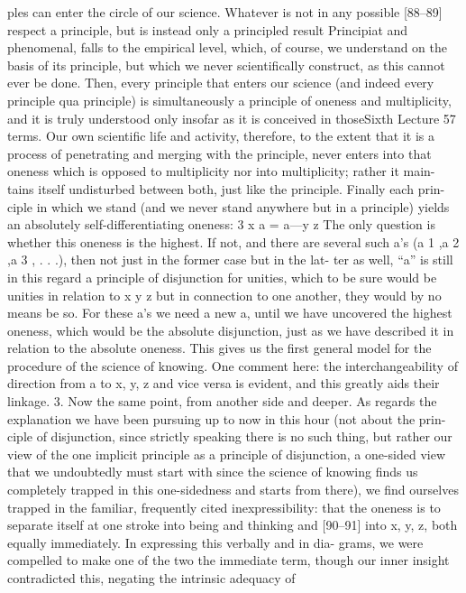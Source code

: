 ples can enter the circle of our science. Whatever is not in any possible
[88–89] respect a principle, but is instead only a principled result {Principiat}
and phenomenal, falls to the empirical level, which, of course, we understand
on the basis of its principle, but which we never scientifically construct, as this
cannot ever be done. Then, every principle that enters our science (and indeed
every principle qua principle) is simultaneously a principle of oneness and
multiplicity, and it is truly understood only insofar as it is conceived in thoseSixth Lecture
57
terms. Our own scientific life and activity, therefore, to the extent that it is a
process of penetrating and merging with the principle, never enters into that
oneness which is opposed to multiplicity nor into multiplicity; rather it main-
tains itself undisturbed between both, just like the principle. Finally each prin-
ciple in which we stand (and we never stand anywhere but in a principle)
yields an absolutely self-differentiating oneness: 3
x
a = a—y
z
The only question is whether this oneness is the highest. If not, and there
are several such a’s (a 1 ,a 2 ,a 3 , . . .), then not just in the former case but in the lat-
ter as well, “a” is still in this regard a principle of disjunction for unities, which
to be sure would be unities in relation to
x
y
z
but in connection to one another, they would by no means be so. For these a’s
we need a new a, until we have uncovered the highest oneness, which would
be the absolute disjunction, just as we have described it in relation to the
absolute oneness. This gives us the first general model for the procedure of the
science of knowing.
One comment here: the interchangeability of direction from a to x, y, z
and vice versa is evident, and this greatly aids their linkage.
3. Now the same point, from another side and deeper. As regards the
explanation we have been pursuing up to now in this hour (not about the prin-
ciple of disjunction, since strictly speaking there is no such thing, but rather our
view of the one implicit principle as a principle of disjunction, a one-sided
view that we undoubtedly must start with since the science of knowing finds
us completely trapped in this one-sidedness and starts from there), we find
ourselves trapped in the familiar, frequently cited inexpressibility: that the
oneness is to separate itself at one stroke into being and thinking and [90–91]
into x, y, z, both equally immediately. In expressing this verbally and in dia-
grams, we were compelled to make one of the two the immediate term,
though our inner insight contradicted this, negating the intrinsic adequacy of
